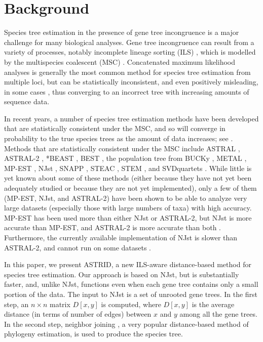
\section{Background}
Species tree estimation in the presence of gene tree incongruence is a
major challenge for many biological analyses. Gene tree incongruence
can result from a variety of processes, notably incomplete lineage
sorting (ILS) \cite{maddison1997gene}, which is modelled by the multispecies
coalescent (MSC) \cite{Kingman1982}. 
Concatenated
maximum likelihood analyses is generally the most
common method for species tree estimation
from multiple loci, but can be statistically inconsistent,
and even positively misleading, in
some cases \cite{RochSteel-journal}, thus 
converging to an incorrect tree 
with increasing amounts of sequence data. 

In recent years, a number of species
tree estimation methods have been developed that are statistically
consistent under the MSC, and so
will converge in probability to the true species trees
as the amount of data increases;
see \cite{Degnan2009,liu2009coalescent,KnowlesKubatkoBook}.
Methods that
are statistically consistent under the MSC  include 
ASTRAL \cite{ASTRAL}, ASTRAL-2
\cite{ASTRALII},
*BEAST \cite{StarBEAST},
BEST \cite{BEST},  
the population tree from BUCKy \cite{larget2010bucky},
METAL \cite{metal},
MP-EST \cite{MPEST}, 
NJst \cite{liu2011estimating},
SNAPP \cite{bryant2012inferring}, 
STEAC \cite{STEAC},
STEM \cite{STEM}, and
SVDquartets \cite{svdquartets}.
While little is yet known about some of
these methods (either because they have not yet
been adequately studied or because
they are not yet implemented), only a
few of them (MP-EST, NJst, and ASTRAL-2)
have been shown to be able to analyze very large datasets (especially
those with large numbers of taxa) with high
accuracy.
MP-EST has been used more than either NJst or ASTRAL-2,
but  NJst is more accurate than MP-EST, and ASTRAL-2 
is more accurate than both  \cite{ASTRALII}.
Furthermore, the currently available implementation of NJst is
slower than ASTRAL-2, and cannot run on some datasets 
\cite{ASTRALII,NJst}.

In this paper, we present ASTRID, a new ILS-aware distance-based
method for species tree estimation.  Our approach is based on NJst,
but is substantially faster, and, unlike NJst, functions even when
each gene tree contains only a small portion of the data.  The input
to NJst is a set of unrooted gene trees.
In the first step, an $n \times n$
matrix $D[x,y]$ is computed, where $D[x,y]$ is the average distance
(in terms of number of edges) between $x$ and $y$ among all the gene
trees.  In the second step, neighbor joining \cite{nj}, a very popular
distance-based method of phylogeny estimation, is used to produce the
species tree.  %


